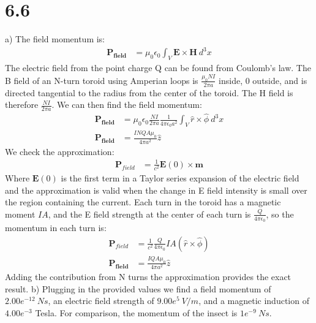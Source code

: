 \documentclass[a4paper,11pt]{article}
\numberwithin{equation}{section}
\newcommand{\bv}[1]{\mathbf{#1}}
\newcommand{\ez}{\epsilon_0}
\begin{document}
\section{6.6}
a) The field momentum is:
\begin{align}
 \bv{P_{field}} &= \mu_0\ez\int_V \bv{E} \times \bv{H}\ d^3x
\end{align}
The electric field from the point charge Q can be found from Coulomb's law.
The B field of an N-turn toroid using Amperian loops is $\frac{\mu_0NI}{2\pi a}$ inside, 0 outside, and is directed tangential to the radius from the center of the toroid.
The H field is therefore $\frac{NI}{2\pi a}$.
We can then find the field momentum:
\begin{align}
 \bv{P_{field}} &= \mu_0\ez  \frac{NI}{2\pi a} \frac{1}{4\pi\ez a^2} \int_V  \hat{r} \times \hat{\phi} \ d^3x\\
 \bv{P_{field}} &= \frac{INQA\mu_0}{4\pi a^2}\hat{z}
\end{align}
We check the approximation:
\begin{align}
 \bv{P}_{field} &= \frac{1}{c^2}\bv{E}(0) \times \bv{m}
\end{align}
Where $\bv{E}(0)$ is the first term in a Taylor series expansion of the electric field and the approximation is valid when the change in E field intensity is small over the region containing the current.
Each turn in the toroid has a magnetic moment $IA$, and the E field strength at the center of each turn is $\frac{Q}{4\pi\ez}$, so the momentum in each turn is:
\begin{align}
 \bv{P}_{field} &= \frac{1}{c^2} \frac{Q}{4\pi\ez} IA (\hat{r} \times \hat{\phi})\\
 \bv{P_{field}} &= \frac{IQA\mu_0}{4\pi a^2}\hat{z}
\end{align}
Adding the contribution from N turns the approximation provides the exact result.
b) Plugging in the provided values we find a field momentum of $2.00e^{-12}\ Ns$, an electric field strength of $9.00e^5\ V/m$, and a magnetic induction of $4.00e^{-3}$ Tesla.
For comparison, the momentum of the insect is $1e^{-9}\ Ns$.
\end{document}
